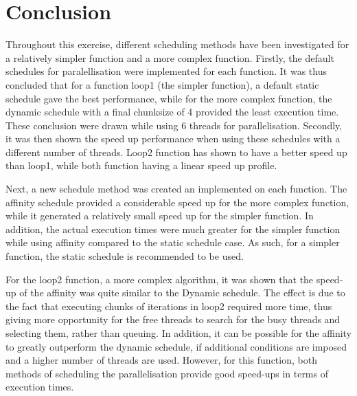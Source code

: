 \documentclass[12pt]{article}
\begin{document}
	\section{Conclusion}
	Throughout this exercise, different scheduling methods have been investigated for a relatively simpler function and a more complex function. Firstly, the default schedules for paralellisation were implemented for each function. It was thus concluded that for a function loop1 (the simpler function), a default static schedule gave the best performance, while for the more complex function, the dynamic schedule with a final chunksize of 4 provided the least execution time. These conclusion were drawn while using 6 threads for parallelisation. Secondly, it was then shown the speed up performance when using these schedules with a different number of threads. Loop2 function has shown to have a better speed up than loop1, while both function having a linear speed up profile.
	
	Next, a new schedule method was created an implemented on each function. The affinity schedule provided a considerable speed up for the more complex function, while it generated a relatively small speed up for the simpler function. In addition, the actual execution times were much greater for the simpler function while using affinity compared to the static schedule case. As such, for a simpler function, the static schedule is recommended to be used. 
	
	For the loop2 function, a more complex algorithm, it was shown that the speed-up of the affinity was quite similar to the Dynamic schedule. The effect is due to the fact that executing chunks of iterations in loop2 required more time, thus giving more opportunity for the free threads to search for the busy threads and selecting them, rather than queuing. In addition, it can be possible for the affinity to greatly outperform the dynamic schedule, if additional conditions are imposed and a higher number of threads are used. However, for this function, both methods of scheduling the parallelisation provide good speed-ups in terms of execution times. 
	
\end{document}
